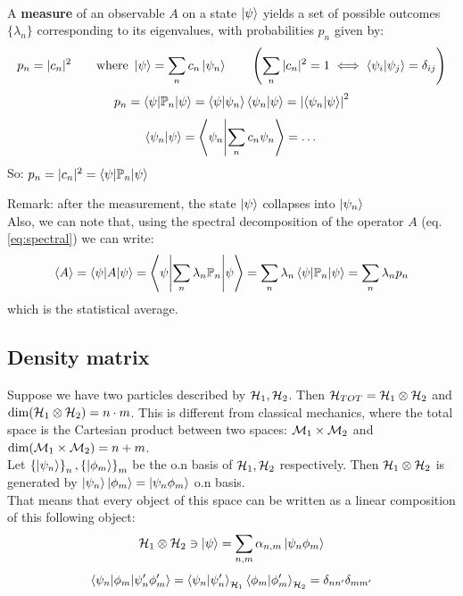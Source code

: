\\

A \textbf{measure} of an observable $A$ on a state $\left|\psi\right\rangle$ yields a set of possible outcomes $\{\lambda_n\}$ corresponding to its eigenvalues, with probabilities $p_n$ given by: 
$$p_n = |c_n|^2 \qquad \text{where } \left|\psi\right\rangle = \sum_n c_n \left|\psi_n\right\rangle \qquad \left(\sum_n |c_n|^2 = 1 \iff \left\langle \psi_i \middle| \psi_j \right\rangle = \delta_{ij} \right)$$
$$ p_n = \left\langle \psi \middle| \mathbb{P}_n \middle| \psi \right\rangle = \left\langle \psi \middle| \psi_n \right\rangle\left\langle \psi_n \middle| \psi \right\rangle = \left|\left\langle \psi_n \middle| \psi \right\rangle\right|^2$$
$$ \left\langle \psi_n \middle| \psi \right\rangle = \left\langle \psi_n \middle| \sum_n c_n \psi_n \right\rangle = \dots $$
So:  $ p_n = |c_n|^2 = \left\langle \psi \middle| \mathbb{P}_n \middle| \psi \right\rangle$

Remark: after the measurement, the state $\left|\psi\right\rangle$ collapses into $\left|\psi_n\right\rangle$\\

Also, we can note that, using the spectral decomposition of the operator $A$ (eq. \ref{eq:spectral}) we can write:
$$\left<A\right> = \left\langle \psi \middle| A \middle| \psi \right\rangle = \left\langle \psi \middle| \sum_n\lambda_n\mathbb{P}_n \middle| \psi \right\rangle = \sum_n \lambda_n \left\langle \psi \middle| \mathbb{P}_n \middle| \psi \right\rangle = \sum_n \lambda_n p_n$$
which is the statistical average.\\


\subsection{Density matrix}
Suppose we have two particles described by $\mathcal{H}_1, \mathcal{H}_2$. Then $\mathcal{H}_{TOT} = \mathcal{H}_1 \otimes \mathcal{H}_2$ and $\dim(\mathcal{H}_1\otimes\mathcal{H}_2) = n\cdot m$. This is different from classical mechanics, where the total space is the Cartesian product between two spaces: $\mathcal{M}_1 \times \mathcal{M}_2$ and $\dim (\mathcal{M}_1 \times \mathcal{M}_2) = n+m$.\\

Let $\left\{\left|\psi_n\right\rangle\right\}_n, \left\{\left|\phi_m\right\rangle\right\}_m$ be the o.n basis of $\mathcal{H}_1,\mathcal{H}_2$ respectively. Then $\mathcal{H}_1 \otimes \mathcal{H}_2$ is generated by $\left|\psi_n\right\rangle\left|\phi_m\right\rangle = \left|\psi_n\phi_m\right\rangle$ o.n basis.\\
That means that every object of this space can be written as a linear composition of this following object:
$$\mathcal{H}_1 \otimes \mathcal{H}_2 \ni \left|\psi\right\rangle = \sum_{n,m} \alpha_{n,m} \left|\psi_n\phi_m\right\rangle$$
$$\left\langle \psi_n \middle| \phi_m \middle| \psi_n'\phi_m' \right\rangle = \left\langle \psi_n \middle| \psi_n' \right\rangle_{\mathcal{H}_1}\left\langle \phi_m \middle| \phi_m' \right\rangle_{\mathcal{H}_2} = \delta_{nn'}\delta_{mm'}$$

